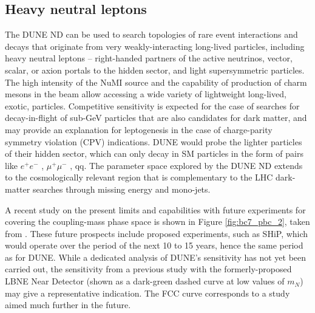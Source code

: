 \subsection{Heavy neutral leptons}
 The DUNE ND can be used to search topologies of rare event interactions and decays that originate
 from very weakly-interacting long-lived particles, including heavy neutral leptons -- right-handed
 partners of the active neutrinos, vector, scalar, or axion portals to the hidden sector, and light
 supersymmetric particles. The high intensity of the NuMI source and the capability of production
 of charm mesons in the beam allow accessing a wide variety of lightweight long-lived, exotic,
 particles. Competitive sensitivity is expected for the case of searches for decay-in-flight of sub-GeV
 particles that are also candidates for dark matter, and may provide an explanation for leptogenesis
 in the case of charge-parity symmetry violation (CPV) indications. DUNE would probe the lighter
 particles of their hidden sector, which can only decay in SM particles in the form of pairs like $e^+e^-$ ,
 $\mu^+\mu^-$ , qq. The parameter space explored by the DUNE ND extends to the cosmologically relevant
region that is complementary to the LHC dark-matter searches through missing energy
 and mono-jets. 

A recent study on the present limits  and capabilities with future experiments for covering the coupling-mass phase space 
is shown in Figure \ref{fig:bc7_pbc_2}, taken from \cite{Beacham:2019nyx}. These future prospects include proposed experiments, such as SHiP, 
which would operate over the period of the next 10 to 15 years, hence the same period as for DUNE.  While a dedicated analysis of DUNE's sensitivity has not yet been carried out, the sensitivity from a previous study with the formerly-proposed LBNE Near Detector (shown as a dark-green dashed curve at low values of $m_N$) may give a representative indication.
The FCC curve corresponds to a study aimed much further in the future.


